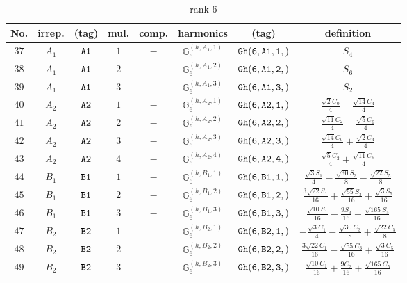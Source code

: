 \documentclass[fleqn,8pt]{jsarticle}
\begin{document}
\begin{table}[ht!]
\begin{center}
\caption{rank 6}
\renewcommand{\arraystretch}{1.3}
\begin{tabular}{cccccccc} \hline \hline
No. & irrep. & (tag) & mul. & comp. & harmonics & (tag) & definition \\ \hline
$ 37 $ & $ A_{1} $ & $ {\tt A1} $ & $ 1 $ & $ - $ & $ \mathbb{G}_{6}^{(h,A_{1},1)} $ & $ {\tt Gh(6,A1,1,)} $ & $ S_{4} $ \\
$ 38 $ & $ A_{1} $ & $ {\tt A1} $ & $ 2 $ & $ - $ & $ \mathbb{G}_{6}^{(h,A_{1},2)} $ & $ {\tt Gh(6,A1,2,)} $ & $ S_{6} $ \\
$ 39 $ & $ A_{1} $ & $ {\tt A1} $ & $ 3 $ & $ - $ & $ \mathbb{G}_{6}^{(h,A_{1},3)} $ & $ {\tt Gh(6,A1,3,)} $ & $ S_{2} $ \\
$ 40 $ & $ A_{2} $ & $ {\tt A2} $ & $ 1 $ & $ - $ & $ \mathbb{G}_{6}^{(h,A_{2},1)} $ & $ {\tt Gh(6,A2,1,)} $ & $ \frac{\sqrt{2} C_{0}}{4} - \frac{\sqrt{14} C_{4}}{4} $ \\
$ 41 $ & $ A_{2} $ & $ {\tt A2} $ & $ 2 $ & $ - $ & $ \mathbb{G}_{6}^{(h,A_{2},2)} $ & $ {\tt Gh(6,A2,2,)} $ & $ \frac{\sqrt{11} C_{2}}{4} - \frac{\sqrt{5} C_{6}}{4} $ \\
$ 42 $ & $ A_{2} $ & $ {\tt A2} $ & $ 3 $ & $ - $ & $ \mathbb{G}_{6}^{(h,A_{2},3)} $ & $ {\tt Gh(6,A2,3,)} $ & $ \frac{\sqrt{14} C_{0}}{4} + \frac{\sqrt{2} C_{4}}{4} $ \\
$ 43 $ & $ A_{2} $ & $ {\tt A2} $ & $ 4 $ & $ - $ & $ \mathbb{G}_{6}^{(h,A_{2},4)} $ & $ {\tt Gh(6,A2,4,)} $ & $ \frac{\sqrt{5} C_{2}}{4} + \frac{\sqrt{11} C_{6}}{4} $ \\
$ 44 $ & $ B_{1} $ & $ {\tt B1} $ & $ 1 $ & $ - $ & $ \mathbb{G}_{6}^{(h,B_{1},1)} $ & $ {\tt Gh(6,B1,1,)} $ & $ \frac{\sqrt{3} S_{1}}{4} - \frac{\sqrt{30} S_{3}}{8} - \frac{\sqrt{22} S_{5}}{8} $ \\
$ 45 $ & $ B_{1} $ & $ {\tt B1} $ & $ 2 $ & $ - $ & $ \mathbb{G}_{6}^{(h,B_{1},2)} $ & $ {\tt Gh(6,B1,2,)} $ & $ \frac{3 \sqrt{22} S_{1}}{16} + \frac{\sqrt{55} S_{3}}{16} + \frac{\sqrt{3} S_{5}}{16} $ \\
$ 46 $ & $ B_{1} $ & $ {\tt B1} $ & $ 3 $ & $ - $ & $ \mathbb{G}_{6}^{(h,B_{1},3)} $ & $ {\tt Gh(6,B1,3,)} $ & $ \frac{\sqrt{10} S_{1}}{16} - \frac{9 S_{3}}{16} + \frac{\sqrt{165} S_{5}}{16} $ \\
$ 47 $ & $ B_{2} $ & $ {\tt B2} $ & $ 1 $ & $ - $ & $ \mathbb{G}_{6}^{(h,B_{2},1)} $ & $ {\tt Gh(6,B2,1,)} $ & $ - \frac{\sqrt{3} C_{1}}{4} - \frac{\sqrt{30} C_{3}}{8} + \frac{\sqrt{22} C_{5}}{8} $ \\
$ 48 $ & $ B_{2} $ & $ {\tt B2} $ & $ 2 $ & $ - $ & $ \mathbb{G}_{6}^{(h,B_{2},2)} $ & $ {\tt Gh(6,B2,2,)} $ & $ \frac{3 \sqrt{22} C_{1}}{16} - \frac{\sqrt{55} C_{3}}{16} + \frac{\sqrt{3} C_{5}}{16} $ \\
$ 49 $ & $ B_{2} $ & $ {\tt B2} $ & $ 3 $ & $ - $ & $ \mathbb{G}_{6}^{(h,B_{2},3)} $ & $ {\tt Gh(6,B2,3,)} $ & $ \frac{\sqrt{10} C_{1}}{16} + \frac{9 C_{3}}{16} + \frac{\sqrt{165} C_{5}}{16} $ \\
 \hline \hline
\end{tabular}
\end{center}
\end{table}
\end{document}
